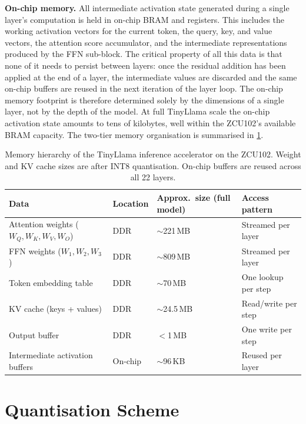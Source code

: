 \noindent\textbf{On-chip memory.} All intermediate activation state
generated during a single layer's computation is held in on-chip BRAM
and registers. This includes the working activation vectors for the current
token, the query, key, and value vectors, the attention score accumulator,
and the intermediate representations produced by the FFN sub-block. The
critical property of all this data is that none of it needs to persist
between layers: once the residual addition has been applied at the end of
a layer, the intermediate values are discarded and the same on-chip buffers
are reused in the next iteration of the layer loop. The on-chip memory
footprint is therefore determined solely by the dimensions of a single layer,
not by the depth of the model. At full TinyLlama scale the on-chip activation
state amounts to tens of kilobytes, well within the ZCU102's available BRAM
capacity. The two-tier memory organisation is summarised in
\cref{tab:memory_hierarchy}.

\begin{table}[H]
  \centering
  \begin{tabular}{llll}
    \toprule
    Data & Location & Approx.\ size (full model) & Access pattern \\
    \midrule
    Attention weights ($W_Q, W_K, W_V, W_O$) & DDR     & $\sim$221\,MB  & Streamed per layer \\
    FFN weights ($W_1, W_2, W_3$)             & DDR     & $\sim$809\,MB  & Streamed per layer \\
    Token embedding table                     & DDR     & $\sim$70\,MB   & One lookup per step \\
    KV cache (keys + values)                  & DDR     & $\sim$24.5\,MB & Read/write per step \\
    Output buffer                             & DDR     & $<$1\,MB       & One write per step \\
    Intermediate activation buffers           & On-chip & $\sim$96\,KB   & Reused per layer \\
    \bottomrule
  \end{tabular}
  \caption{Memory hierarchy of the TinyLlama inference accelerator on the
           ZCU102. Weight and KV cache sizes are after INT8 quantisation.
           On-chip buffers are reused across all 22 layers.}
  \label{tab:memory_hierarchy}

\end{table}

\section{Quantisation Scheme}
\label{sec:quant_scheme}

